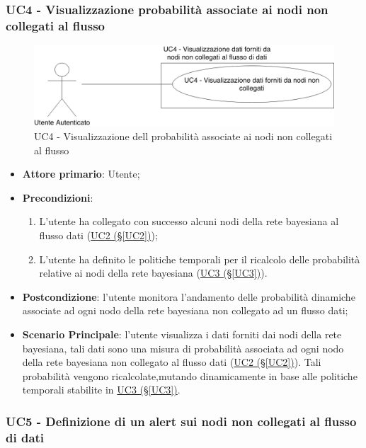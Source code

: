 \newpage
\subsubsection{UC4 - Visualizzazione probabilità associate ai nodi non collegati al flusso}\label{UC4}

\begin{figure}[H]
\centering
\includegraphics[scale=0.4]{./images/UC4.png}
\caption{UC4 - Visualizzazione dell probabilità associate ai nodi non collegati al flusso}
\end{figure}

\begin{itemize}
\item \textbf{Attore primario}: Utente;
\item \textbf{Precondizioni}:
	\begin{enumerate}
	\item L'utente ha collegato con successo alcuni nodi della rete bayesiana al flusso dati (\hyperref[UC2]{UC2 (§\ref*{UC2})});
	\item L'utente ha definito le politiche temporali per il ricalcolo delle probabilità relative ai nodi della rete bayesiana (\hyperref[UC3]{UC3 (§\ref*{UC3})}).
	\end{enumerate}
\item \textbf{Postcondizione}: l'utente monitora l'andamento delle probabilità dinamiche associate ad ogni nodo della rete bayesiana non collegato ad un flusso dati;
\item \textbf{Scenario Principale}: l'utente visualizza i dati forniti dai nodi della rete bayesiana, tali dati sono una misura di probabilità associata ad ogni nodo della rete bayesiana non collegato al flusso dati (\hyperref[UC2]{UC2 (§\ref*{UC2})}). Tali probabilità vengono ricalcolate,mutando dinamicamente in base alle politiche temporali stabilite in \hyperref[UC3]{UC3 (§\ref*{UC3})}.
\end{itemize}

\pagebreak

\subsubsection{UC5 - Definizione di un alert sui nodi non collegati al flusso di dati}\label{UC5}

